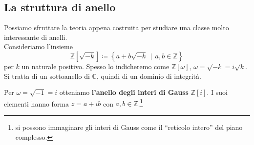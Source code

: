 \subsection{La struttura di anello}
\label{lezione5}
Possiamo sfruttare la teoria appena costruita per studiare una classe molto interessante di anelli. \\
Consideriamo l'insieme
\begin{equation*}
\mathbb{Z}[\sqrt{-k}]\coloneqq \left\{a+b\sqrt{-k} \, \mid \, a,b\in\mathbb{Z}\right\}
\end{equation*}
per $k$ un naturale positivo. Spesso lo indicheremo come $\mathbb{Z}[\omega]$, $\omega = \sqrt{-k}=i\sqrt{k}$. \\ Si tratta di un sottoanello di $\mathbb{C}$, quindi di un dominio di integrità.
\begin{definizione} 
	Per $\omega=\sqrt{-1}=i$ otteniamo \textbf{l'anello degli interi di Gauss} $\mathbb{Z}[i]$. I suoi elementi hanno forma $z=a+ib$ con $a,b\in\mathbb{Z}$.\footnote{si possono immaginare gli interi di Gauss come il \enquote{reticolo intero} del piano complesso.}
\end{definizione}
